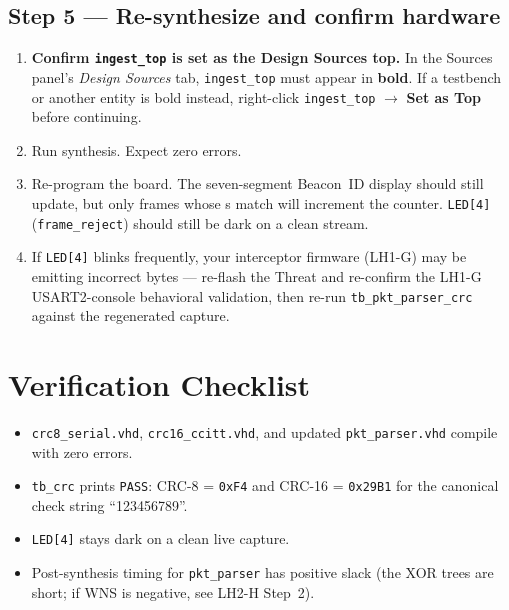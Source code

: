 \documentclass[11pt,letterpaper]{article}
\begin{document}
\subsection{Step 5 --- Re-synthesize and confirm hardware}
\begin{enumerate}[leftmargin=2em]
	\item \textbf{Confirm \texttt{ingest\_top} is set as the Design Sources top.} In the Sources panel's \textit{Design Sources} tab, \texttt{ingest\_top} must appear in \textbf{bold}. If a testbench or another entity is bold instead, right-click \texttt{ingest\_top} $\to$ \textbf{Set as Top} before continuing.
	\item Run synthesis. Expect zero errors.
	\item Re-program the board. The seven-segment Beacon~ID display should still update, but only frames whose \CRC{}s match will increment the counter. \texttt{LED[4]} (\texttt{frame\_reject}) should still be dark on a clean stream.
	\item If \texttt{LED[4]} blinks frequently, your interceptor firmware (LH1-G) may be emitting incorrect \CRC{} bytes --- re-flash the Threat and re-confirm the LH1-G USART2-console behavioral validation, then re-run \texttt{tb\_pkt\_parser\_crc} against the regenerated capture.
\end{enumerate}


\section{Verification Checklist}
\begin{itemize}[leftmargin=2em]
	\item[$\square$] \texttt{crc8\_serial.vhd}, \texttt{crc16\_ccitt.vhd}, and updated \texttt{pkt\_parser.vhd} compile with zero errors.
	\item[$\square$] \texttt{tb\_crc} prints \texttt{PASS}: CRC-8 = \texttt{0xF4} and CRC-16 = \texttt{0x29B1} for the canonical check string ``123456789''.
	\item[$\square$] \texttt{LED[4]} stays dark on a clean live capture.
	\item[$\square$] Post-synthesis timing for \texttt{pkt\_parser} has positive slack (the \CRC{} XOR trees are short; if WNS is negative, see LH2-H Step~2).
\end{itemize}
\end{document}
